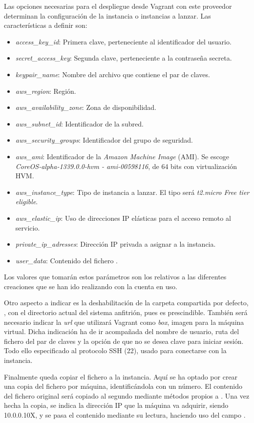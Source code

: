 Las opciones necesarias para el despliegue desde Vagrant con este proveedor determinan la configuración de la instancia o instancias a lanzar. Las características a definir son:
\begin{itemize}
\item \textit{access\_key\_id}: Primera clave, perteneciente al identificador del usuario.
\item \textit{secret\_access\_key}: Segunda clave, perteneciente a la contraseña secreta.
\item \textit{keypair\_name}: Nombre del archivo que contiene el par de claves.
\item \textit{aws\_region}: Región.
\item \textit{aws\_availability\_zone}: Zona de disponibilidad.
\item \textit{aws\_subnet\_id}: Identificador de la subred.
\item \textit{aws\_security\_groups}: Identificador del grupo de seguridad.
\item \textit{aws\_ami}: Identificador de la \textit{Amazon Machine Image} (AMI). Se escoge \textit{CoreOS-alpha-1339.0.0-hvm - ami-00598116}, de 64 bits con virtualización HVM.
\item \textit{aws\_instance\_type}: Tipo de instancia a lanzar. El tipo será \textit{t2.micro Free tier eligible}.
\item \textit{aws\_elastic\_ip}: Uso de direcciones IP elásticas para el acceso remoto al servicio.
\item \textit{private\_ip\_adresses}: Dirección IP privada a asignar a la instancia.
\item \textit{user\_data}: Contenido del fichero .
\end{itemize}

Los valores que tomarán estos parámetros son los relativos a las diferentes creaciones que se han ido realizando con la cuenta en uso.

Otro aspecto a indicar es la deshabilitación de la carpeta compartida por defecto, , con el directorio actual del sistema anfitrión, pues es prescindible. También será necesario indicar la \textit{url} que utilizará Vagrant como \textit{box}, imagen para la máquina virtual. Dicha indicación ha de ir acompañada del nombre de usuario, ruta del fichero del par de claves y la opción de que no se desea clave para iniciar sesión. Todo ello especificado al protocolo SSH (22), usado para conectarse con la instancia.

Finalmente queda copiar el fichero  a la instancia. Aquí se ha optado por crear una copia del fichero  por máquina, identificándola con un número. El contenido del fichero original será copiado al segundo mediante métodos propios a . Una vez hecha la copia, se indica la dirección IP que la máquina va adquirir, siendo 10.0.0.10X, y se pasa el contenido mediante su lectura, haciendo uso del campo .

